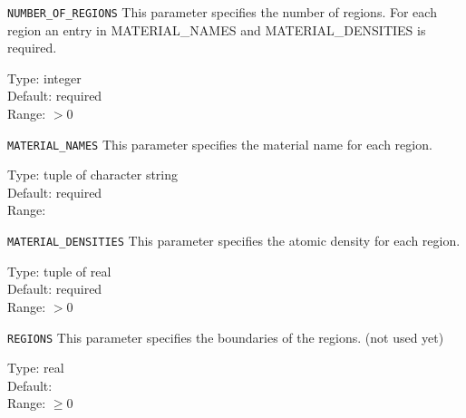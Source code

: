 \begin{keydescription}{\texttt{NUMBER\_OF\_REGIONS}}
This parameter specifies the number of regions. For each region an entry in MATERIAL\_NAMES and MATERIAL\_DENSITIES is required.
\begin{keytab}
   Type:    \> integer \\
   Default: \> required \\
   Range:   \> $ > 0$
\end{keytab}
\end{keydescription}

\begin{keydescription}{\texttt{MATERIAL\_NAMES}}
This parameter specifies the material name for each region. 
\begin{keytab}
   Type:    \> tuple of character string \\
   Default: \> required \\
   Range:   \> 
\end{keytab}
\end{keydescription}

\begin{keydescription}{\texttt{MATERIAL\_DENSITIES}}
This parameter specifies the atomic density for each region. 
\begin{keytab}
   Type:    \> tuple of real \\
   Default: \> required \\
   Range:   \> $ > 0 $
\end{keytab}
\end{keydescription}

\begin{keydescription}{\texttt{REGIONS}}
This parameter specifies the boundaries of the regions. (not used yet)
\begin{keytab}
   Type:    \> real \\
   Default:  \\
   Range:   \> $\ge 0$
\end{keytab}
\end{keydescription}



